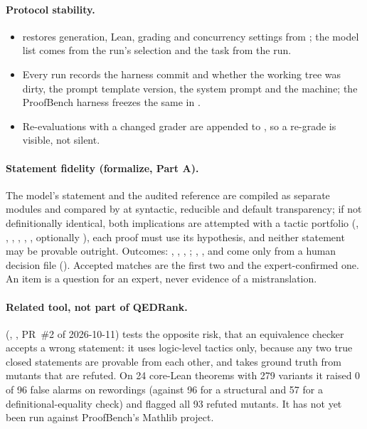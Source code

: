 \documentclass[11pt,a4paper]{article}
\begin{document}
\paragraph{Protocol stability.}
\begin{itemize}
\item {} restores generation, Lean, grading and concurrency settings from ; the model list comes from the run's selection and the task from the run.
\item Every run records the harness commit and whether the working tree was dirty, the prompt template version, the system prompt and the machine; the ProofBench harness freezes the same in .
\item Re-evaluations with a changed grader are appended to , so a re-grade is visible, not silent.
\end{itemize}

\paragraph{Statement fidelity (formalize, Part A).} The model's statement and the audited reference are compiled as separate modules and compared by  at syntactic, reducible and default transparency; if not definitionally identical, both implications are attempted with a tactic portfolio (, , , , , , optionally ), each proof must use its hypothesis, and neither statement may be provable outright. Outcomes: , , , ; , ,  and  come only from a human decision file (). Accepted matches are the first two and the expert-confirmed one. An  item is a question for an expert, never evidence of a mistranslation.

\paragraph{Related tool, not part of QEDRank.}  (, , PR~\#2 of 2026-10-11) tests the opposite risk, that an equivalence checker accepts a wrong statement: it uses logic-level tactics only, because any two true closed statements are provable from each other, and takes ground truth from mutants that are refuted. On 24 core-Lean theorems with 279 variants it raised 0 of 96 false alarms on rewordings (against 96 for a structural and 57 for a definitional-equality check) and flagged all 93 refuted mutants. It has not yet been run against ProofBench's Mathlib project.
\end{document}
